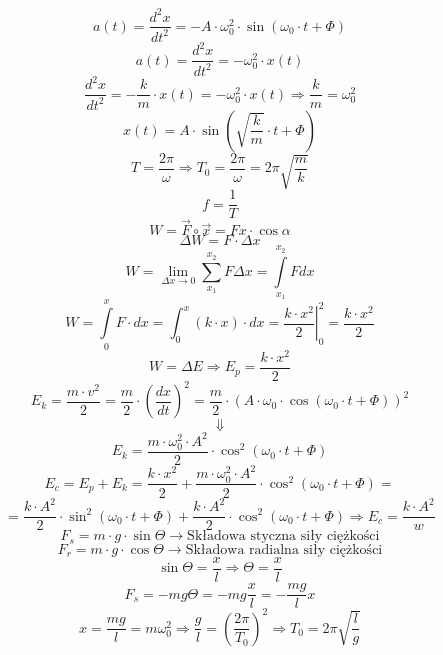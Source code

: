\documentclass{article}
\begin{document}
\begin{enumerate}
		\[
		a(t) = \frac{d^2 x}{dt^2} = -A \cdot \omega_0^2 \cdot \sin(\omega_0 \cdot t + \varPhi)
		\]
		\[
		a(t) = \frac{d^2x}{dt^2} = -\omega_0^2 \cdot x(t)
		\]
		\[
		\frac{d^2 x}{dt^2} = - \frac{k}{m} \cdot x(t) = - \omega^2_0 \cdot x(t) \Rightarrow \frac{k}{m} = \omega_0^2
		\]
		\[
		x(t) = A \cdot \sin \left(\sqrt{\frac{k}{m}} \cdot t + \varPhi \right)
		\]
		\[
		T = \frac{2 \pi}{\omega} \Longrightarrow T_0 = \frac{2 \pi}{\omega} = 2 \pi \sqrt{\frac{m}{k}}
		\]
		\[
		f = \frac{1}{T}
		\]
		\[
		W = \vec{F} \circ \vec{x} = Fx \cdot \cos \alpha
		\]
		\[
		\Delta W = F \cdot \Delta x
		\]
		\[
		W = \lim\limits_{\Delta x \rightarrow 0} \sum\limits_{x_1}^{x_2} F \Delta x = \int\limits_{x_1}^{x_2} Fdx
		\]
		\[
		W = \int\limits_0^x F \cdot dx = \int_0^x (k \cdot x) \cdot dx = \left. \frac{k \cdot x^2}{2} \right|_0^2 = \frac{k \cdot x^2}{2}
		\]
		\[
		W = \Delta E \Rightarrow E_p = \frac{k \cdot x^2}{2}
		\]
		\[
		E_k = \frac{m \cdot v^2}{2} = \frac{m}{2} \cdot \left( \frac{dx}{dt} \right)^2 = \frac{m}{2} \cdot (A \cdot \omega_0 \cdot \cos(\omega_0 \cdot t + \varPhi))^2 
		\]
		\[
		\Downarrow
		\]
		\[
		E_k = \frac{m \cdot \omega_0^2 \cdot A^2}{2} \cdot \cos^2(\omega_0 \cdot t + \varPhi)
		\]
		\newpage
		\[
		E_c = E_p + E_k = \frac{k \cdot x^2}{2} + \frac{m \cdot \omega_0^2 \cdot A^2}{2} \cdot \cos^2(\omega_0 \cdot t + \varPhi) =
		\]
		\[
		= \frac{k \cdot A^2}{2} \cdot \sin^2(\omega_0 \cdot t + \varPhi) + \frac{k \cdot A^2}{2} \cdot \cos^2(\omega_0 \cdot t + \varPhi) \Rightarrow E_c = \frac{k \cdot A^2}{w}
		\]
		\[
		F_s = m \cdot g \cdot \sin \varTheta \longrightarrow \text{Składowa styczna siły ciężkości}
		\]
		\[
		F_r = m \cdot g \cdot \cos \varTheta \longrightarrow \text{Składowa radialna siły ciężkości}
		\]
		\[
		\sin \varTheta = \frac{x}{l} \Longrightarrow \varTheta = \frac{x}{l}
		\]
		\[
		F_s = -mg\varTheta = -mg \frac{x}{l} = - \frac{mg}{l}x
		\]
		\[
		x = \frac{mg}{l} = m \omega_0^2 \Rightarrow \frac{g}{l} = \left( \frac{2 \pi}{T_0} \right)^2 \Rightarrow T_0 = 2 \pi \sqrt{\frac{l}{g}}
		\]
		
		\renewcommand{\arraystretch}{1.5}
		

\end{enumerate}
\end{document}
